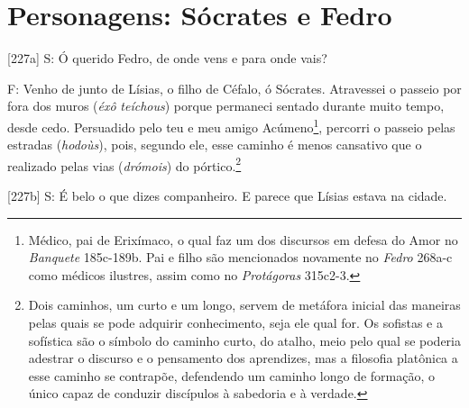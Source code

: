 \section{Personagens: Sócrates e
Fedro}\label{personagens-suxf3crates-e-fedro}

{[}227a{]} S: Ó querido Fedro, de onde vens e para onde vais?

F: Venho de junto de Lísias, o filho de Céfalo, ó Sócrates. Atravessei o
passeio por fora dos muros (\emph{éxô} \emph{teíchous}) porque permaneci
sentado durante muito tempo, desde cedo. Persuadido pelo teu e meu amigo
Acúmeno\footnote{Médico, pai de Erixímaco, o qual faz um dos discursos
  em defesa do Amor no \emph{Banquete} 185c-189b. Pai e filho são
  mencionados novamente no \emph{Fedro} 268a-c como médicos ilustres,
  assim como no \emph{Protágoras} 315c2-3.}, percorri o passeio pelas
estradas (\emph{hodoùs}), pois, segundo ele, esse caminho é menos
cansativo que o realizado pelas vias (\emph{drómois}) do
pórtico.\footnote{Dois caminhos, um curto e um longo, servem de metáfora
  inicial das maneiras pelas quais se pode adquirir conhecimento, seja
  ele qual for. Os sofistas e a sofística são o símbolo do caminho
  curto, do atalho, meio pelo qual se poderia adestrar o discurso e o
  pensamento dos aprendizes, mas a filosofia platônica a esse caminho se
  contrapõe, defendendo um caminho longo de formação, o único capaz de
  conduzir discípulos à sabedoria e à verdade.}

{[}227b{]} S: É belo o que dizes companheiro. E parece que Lísias estava
na cidade.

